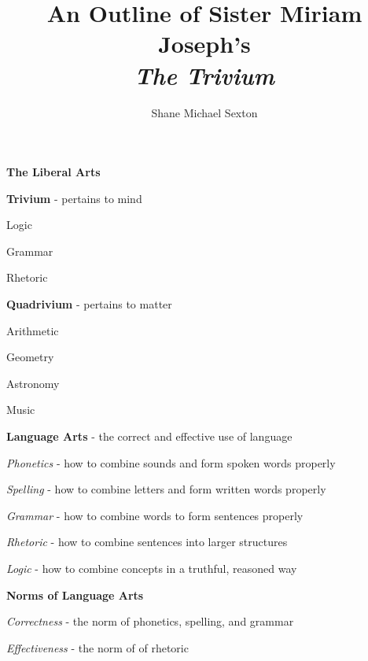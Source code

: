 \documentclass{report}
\begin{document}
\title{An Outline of Sister Miriam Joseph's\\\textit{The Trivium}}
\author{Shane Michael Sexton}

\maketitle

\begin{outline}
  \item {\bf The Liberal Arts}
  \begin{outline}
    \item {\bf Trivium} - pertains to mind
    \begin{outline}
       \item Logic
       \item Grammar
       \item Rhetoric
     \end{outline}
    \item {\bf Quadrivium} - pertains to matter
    \begin{outline}
       \item Arithmetic
       \item Geometry
       \item Astronomy
       \item Music
     \end{outline}
     \item {\bf Language Arts} - the correct and effective use of language
    \begin{outline}
       \item \textit{Phonetics} - how to combine sounds and form spoken words properly
       \item \textit{Spelling} - how to combine letters and form written words properly
       \item \textit{Grammar} - how to combine words to form sentences properly
       \item \textit{Rhetoric} - how to combine sentences into larger structures
       \item \textit{Logic} - how to combine concepts in a truthful, reasoned way
     \end{outline}
    \item {\bf Norms of Language Arts} 
    \begin{outline}
       \item \textit{Correctness} - the norm of phonetics, spelling, and grammar
       \item \textit{Effectiveness} - the norm of of rhetoric

\end{outline}
\end{outline}
\end{outline}
\end{document}
